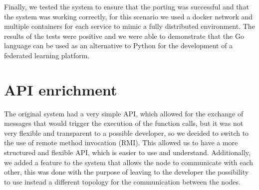 Finally, we tested the system to ensure that the porting was successful and that the system was working correctly, for this scenario we used a docker network and multiple containers for each service to mimic a fully distributed environment. The results of the tests were positive and we were able to demonstrate that the Go language can be used as an alternative to Python for the development of a federated learning platform.

\section{API enrichment}
The original system had a very simple API, which allowed for the exchange of messages that would trigger the execution of the function calls, but it was not very flexible and transparent to a possible developer, so we decided to switch to the use of remote method invocation (RMI). This allowed us to have a more structured and flexible API, which is easier to use and understand. Additionally, we added a feature to the system that allows the node to communicate with each other, this was done with the purpose of leaving to the developer the possibility to use instead a different topology for the communication between the nodes. 